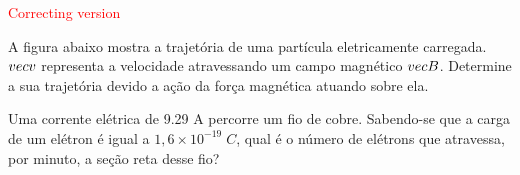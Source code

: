\documentclass[12pt, addpoints]{exam}
\begin{document}
        \begin{center}
\textcolor{red}{\emph\Large Correcting version}\end{center}
\begin{questions}
\begin{multicols*}{2}
\question[20] A ﬁgura abaixo mostra a trajetória de uma partícula eletricamente carregada. $\\vec{{v}}$ representa a velocidade atravessando um campo magnético $\\vec{{B}}$. Determine a sua trajetória devido a ação da força magnética atuando sobre ela.
        
        \begin{center}
            \begin{minipage}[c]{0.5\linewidth}
            \end{minipage}
        \end{center}

        

\begin{oneparchoices}
\end{oneparchoices}
\question[20] Uma corrente elétrica de    9.29 A percorre um ﬁo de cobre. Sabendo-se que a carga de um elétron é igual a $1,6\times 10^{-19}\;C$, qual é o número de elétrons que atravessa, por minuto, a seção reta desse ﬁo?


\end{multicols*}
\end{questions}
\end{document}

